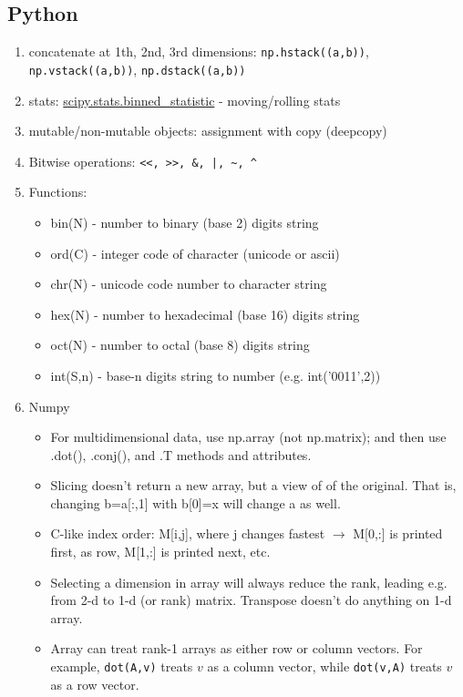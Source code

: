 \documentclass[10pt]{article}
\renewcommand{\c}{\mathbf{c}}
\def\c#1{{\small #1}}
\def\c#1{{\small\verb|#1|}}
\def\c#1{{\small\texttt{#1}}}
\def\np#1{{\small\tt np.#1}}
\begin{document}
\subsection*{Python}
\begin{enumerate}
\item concatenate at 1th, 2nd, 3rd dimensions: \np{hstack((a,b))},
  \np{vstack((a,b))}, \np{dstack((a,b))}
\item stats: \url{scipy.stats.binned_statistic} - moving/rolling stats
\item mutable/non-mutable objects: assignment with copy (deepcopy)
\item Bitwise operations: \verb.<<, >>, &, |, ~, ^.
\item Functions:
  \begin{itemize}
  \item bin(N) - number to binary (base 2) digits string
  \item ord(C) - integer code of character (unicode or ascii)
  \item chr(N) - unicode code number to character string
  \item hex(N) - number to hexadecimal (base 16) digits string
  \item oct(N) - number to octal (base 8) digits string
  \item int(S,n) - base-n digits string to number (e.g. int('0011',2))
  \end{itemize}
\item Numpy
  \begin{itemize}
  \item For multidimensional data, use np.array (not np.matrix); and
    then use .dot(), .conj(), and  .T methods and attributes.
  \item Slicing doesn't return a new array, but a view of of the
    original. That is, changing b=a[:,1] with b[0]=x will change a as well.
  \item C-like index order: M[i,j], where j changes fastest $\to$
    M[0,:] is printed first, as row, M[1,:] is printed next, etc.
  \item Selecting a dimension in array will always reduce the rank,
    leading e.g. from 2-d to 1-d (or rank) matrix. Transpose doesn't
    do anything on 1-d array.
  \item Array can treat rank-1 arrays as either row or column
    vectors. For example, \verb|dot(A,v)| treats $v$ as a column
    vector,
    while \verb|dot(v,A)| treats $v$ as a row vector.\\

\end{itemize}
\end{enumerate}
\end{document}
